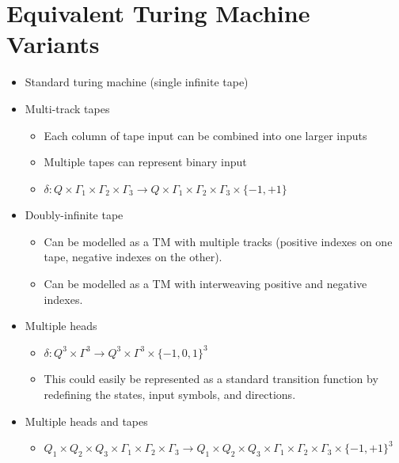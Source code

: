 \documentclass[12pt]{article}
\date{February 18, 2021}
\begin{document}
\maketitle

\section{Equivalent Turing Machine Variants}
\begin{itemize}
    \item Standard turing machine (single infinite tape)
    \item Multi-track tapes
    \begin{itemize}
        \item Each column of tape input can be combined into one larger inputs
        \item Multiple tapes can represent binary input
        \item $\delta: Q \times \Gamma_1 \times \Gamma_2 \times \Gamma_3 \rightarrow Q \times \Gamma_1 \times \Gamma_2 \times \Gamma_3 \times \{ -1, +1 \}$
    \end{itemize}
    \item Doubly-infinite tape
    \begin{itemize}
        \item Can be modelled as a TM with multiple tracks (positive indexes on one tape, negative indexes on the other).
        \item Can be modelled as a TM with interweaving positive and negative indexes.
    \end{itemize}
    \item Multiple heads
    \begin{itemize}
        \item $\delta: Q^3 \times \Gamma^3 \rightarrow Q^3 \times \Gamma^3 \times \{ -1, 0, 1\}^3$
        \item This could easily be represented as a standard transition function by redefining the states, input symbols, and directions.
    \end{itemize}
    \item Multiple heads and tapes
    \begin{itemize}
        \item $Q_1 \times Q_2 \times Q_3 \times \Gamma_1 \times \Gamma_2 \times \Gamma_3 \rightarrow Q_1 \times Q_2 \times Q_3 \times \Gamma_1 \times \Gamma_2 \times \Gamma_3 \times \{ -1, +1 \}^3$
    \end{itemize}
\end{itemize}
\end{document}
